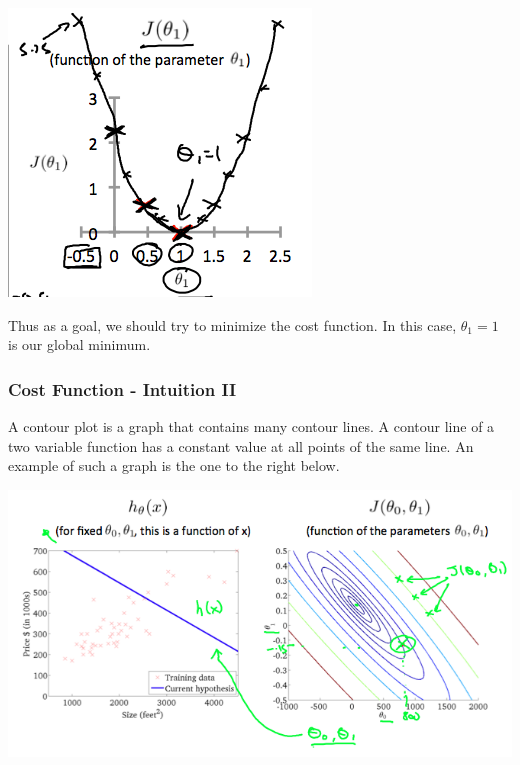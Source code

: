 \documentclass[UTF8]{article}
\begin{document}
\includegraphics[width = \textwidth]{NotePics/2_2_1_3.png}

Thus as a goal, we should try to minimize the cost function. In this case, $\theta_1=1$ is our global minimum.

\subsubsection{Cost Function - Intuition II}

A contour plot is a graph that contains many contour lines. A contour line of a two variable function has a constant value at all points of the same line. An example of such a graph is the one to the right below.

\includegraphics[width = \textwidth]{NotePics/2_2_2_1.png}
\end{document}
